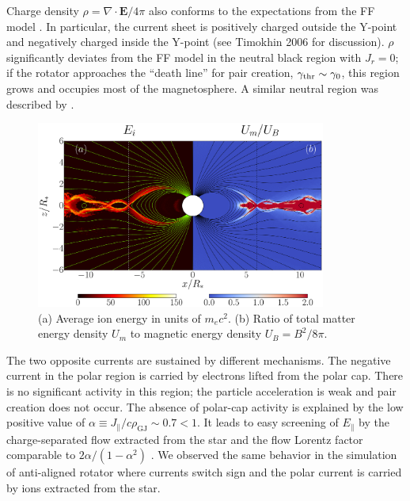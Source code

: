 Charge density $\rho=\nabla\cdot \mathbf{E}/4\pi$
also conforms to the expectations from the FF model
\citep[cf. Figure~16 in][]{parfrey_introducing_2012}.
In particular, the current sheet is positively charged outside the Y-point and
negatively charged inside the Y-point
(see Timokhin 2006 for discussion).
$\rho$ significantly deviates from the FF model in the neutral black region with
$J_r=0$; if the rotator approaches the ``death line''  for pair creation,
$\gamma_{\rm thr}\sim\gamma_0$, this region grows and occupies most of the magnetosphere.
A similar neutral
 region was described by
 \citet{yuki_particle_2012}.

\begin{figure}[t]
    \centering
    \includegraphics[width=0.85\textwidth]{pics/chap3/figure3.eps}
    \caption{\small
    (a) Average ion energy in units of $m_ec^2$. (b) Ratio of total matter energy density
    $U_m$ to magnetic energy density $U_B=B^2/8\pi$.
}
    \label{fig:gamma-U-photon}
\end{figure}


The two opposite currents are sustained by different mechanisms.
The negative current in the polar region is carried by electrons lifted
from the polar cap. There is no significant activity in this region;
the particle acceleration is weak and pair creation does not occur. The absence
of polar-cap activity is explained by the low positive value of
$\alpha\equiv J_\parallel/c\rho_\mathrm{GJ}\sim 0.7 <1$.
It leads to easy screening of $E_\parallel$ by the charge-separated
flow extracted from the star and the flow Lorentz factor
comparable to $2\alpha/(1-\alpha^2)$
\citep{beloborodov_polar-cap_2008,chen_dead_2013}.
We observed the same behavior in the simulation of anti-aligned rotator where currents
switch sign and the polar current is carried by ions extracted from the star.

